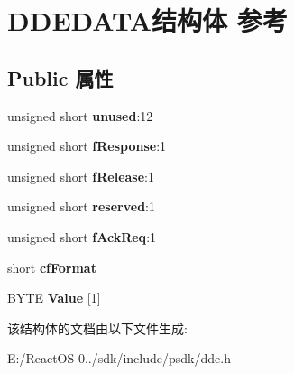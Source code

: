 \hypertarget{struct_d_d_e_d_a_t_a}{}\section{D\+D\+E\+D\+A\+T\+A结构体 参考}
\label{struct_d_d_e_d_a_t_a}
\subsection*{Public 属性}
\begin{DoxyCompactItemize}
\item 
\mbox{\label{struct_d_d_e_d_a_t_a_a9476ad0afd4d0211aacd37ceb563d688}} 
unsigned short {\bfseries unused}\+:12
\item 
\mbox{\label{struct_d_d_e_d_a_t_a_ae25197df28362d3b7a020c33675503ba}} 
unsigned short {\bfseries f\+Response}\+:1
\item 
\mbox{\label{struct_d_d_e_d_a_t_a_af591f920c340a090a16d9416670fdc04}} 
unsigned short {\bfseries f\+Release}\+:1
\item 
\mbox{\label{struct_d_d_e_d_a_t_a_aa0d444126c61069686de06162e1b83a1}} 
unsigned short {\bfseries reserved}\+:1
\item 
\mbox{\label{struct_d_d_e_d_a_t_a_a5a3988eb503244e3da07938efcae8514}} 
unsigned short {\bfseries f\+Ack\+Req}\+:1
\item 
\mbox{\label{struct_d_d_e_d_a_t_a_abdf1d339c3d4cc3196b0ef829fc9f7c8}} 
short {\bfseries cf\+Format}
\item 
\mbox{\label{struct_d_d_e_d_a_t_a_a119f6e5f2a24234a76d5c36b8adc38df}} 
B\+Y\+TE {\bfseries Value} \mbox{[}1\mbox{]}
\end{DoxyCompactItemize}


该结构体的文档由以下文件生成\+:\begin{DoxyCompactItemize}
\item 
E\+:/\+React\+O\+S-\/0../sdk/include/psdk/dde.\+h\end{DoxyCompactItemize}
